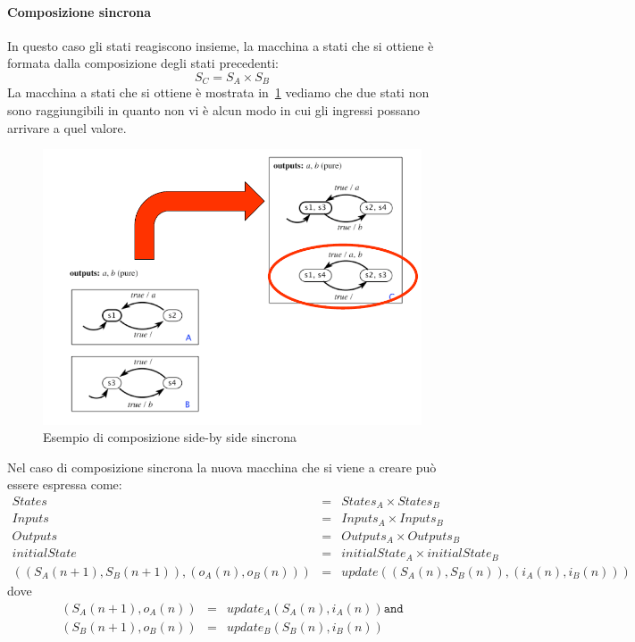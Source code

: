 \paragraph{Composizione sincrona}
In questo caso gli stati reagiscono insieme, la macchina a stati che si ottiene è formata dalla composizione degli stati precedenti:
$$S_C=S_A \times S_B$$
La macchina a stati che si ottiene è mostrata in \figurename\,\ref{fig:sidesincrona} vediamo che due stati non sono raggiungibili in quanto non vi è alcun modo in cui gli ingressi possano arrivare a quel valore.
\begin{figure}
\centering
\includegraphics[scale=0.4]{img/sidesincrona.png}
\caption{Esempio di composizione side-by side sincrona}\label{fig:sidesincrona}
\end{figure}
Nel caso di composizione sincrona la nuova macchina che si viene a creare può essere espressa come:
$$
\begin{array}{lcl}
States & = & States_A \times States_B\\
Inputs & = & Inputs_A \times Inputs_B\\
Outputs & = & Outputs_A \times Outputs_B\\
initialState & = & initialState_A \times initialState_B\\
((S_A(n+1),S_B(n+1)),(o_A(n),o_B(n))) & = & update((S_A(n),S_B(n)),(i_A(n),i_B(n)))  
\end{array}
$$
dove 
$$
\begin{array}{rcl}
(S_A(n+1),o_A(n)) & = & update_A(S_A(n),i_A(n)) \mathtt{and} \\
(S_B(n+1),o_B(n)) & = & update_B(S_B(n),i_B(n)) 
\end{array}
$$
